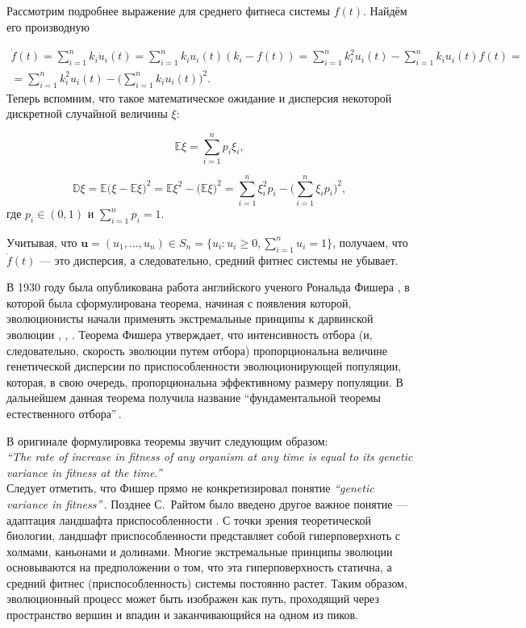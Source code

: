 Рассмотрим подробнее выражение для среднего фитнеса системы $f(t)$. Найдём его производную

\begin{multline*}
\dot{f}(t) = \sum\limits_{i = 1}^{n}k_{i}\dot{u}_{i}(t) = \sum\limits_{i = 1}^{n}k_{i}u_{i}(t)(k_{i} - f(t)) = \sum\limits_{i = 1}^{n}k_{i}^{2}u_{i}(t) - \sum\limits_{i = 1}^{n}k_{i}u_{i}(t)f(t) = \\
= \sum\limits_{i = 1}^{n}k_{i}^{2}u_{i}(t) - \Big(\sum\limits_{i = 1}^{n}k_{i}u_{i}(t)\Big)^{2}.
\end{multline*} 
Теперь вспомним, что такое математическое ожидание и дисперсия некоторой дискретной случайной величины $\xi$:

$$
\mathbb{E}\xi = \sum\limits_{i = 1}^{n}p_{i}\xi_{i},
$$

$$
\mathbb{D}\xi = \mathbb{E}\Big(\xi - \mathbb{E}\xi\Big)^{2} = \mathbb{E}\xi^{2} - \Big(\mathbb{E}\xi\Big)^{2} = \sum\limits_{i = 1}^{n}\xi_{i}^{2}p_{i} - \Big(\sum\limits_{i = 1}^{n}\xi_{i}p_{i}\Big)^{2},
$$
где $p_{i} \in (0, 1)$ и $\sum\limits_{i = 1}^{n}p_{i} = 1$. 

Учитывая, что $\mathbf{u} = (u_{1}, ..., u_{n}) \in S_{n} = \{u_{i}: u_{i} \geqslant 0, \sum\limits_{i = 1}^{n}u_{i} = 1\}$, получаем, что $\dot{f}(t)$ --- это дисперсия, а следовательно, средний фитнес системы не убывает.

В 1930 году была опубликована работа английского ученого Рональда Фишера \cite{Fisher}, в которой была сформулирована теорема, начиная с появления которой, эволюционисты начали применять экстремальные принципы к дарвинской эволюции \cite{Parker}, \cite{grafen1}, \cite{grafen2}. Теорема Фишера утверждает, что интенсивность отбора (и, следовательно, скорость эволюции путем отбора) пропорциональна величине генетической дисперсии по приспособленности эволюционирующей популяции, которая, в свою очередь, пропорциональна эффективному размеру популяции. В дальнейшем данная теорема получила название ``фундаментальной теоремы естественного отбора''\,. 

В оригинале формулировка теоремы звучит следующим образом:\\

\textit{``The rate of increase in fitness of any organism at any time is equal to its genetic variance in fitness at the time.''\,}\\

Следует отметить, что Фишер прямо не конкретизировал понятие \textit{``genetic variance in fitness''\,}. Позднее С.~Райтом было введено другое важное понятие --- адаптация ландшафта приспособленности \cite{wright}. С точки зрения теоретической биологии, ландшафт приспособленности представляет собой гиперповерхноть с холмами, каньонами и долинами. Многие экстремальные принципы эволюции основываются на предположении о том, что эта гиперповерхность статична, а средний фитнес (приспособленность) системы постоянно растет. Таким образом, эволюционный процесс может быть изображен как путь, проходящий через пространство вершин и впадин и заканчивающийся на одном из пиков.

